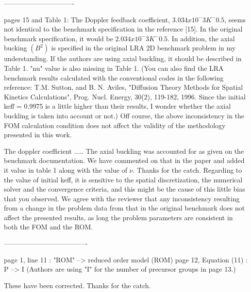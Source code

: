 \documentclass[10pt]{article}
\begin{document}
-------------------------------


\begin{response}
{ pages 15 and Table 1:
	The Doppler feedback coefficient, $3.034x10^-3 K^-0.5$, seems not identical to the benchmark specification in the reference [15]. In the original benchmark specification, it would be $2.034x10^-3 K^-0.5$.
	In addition, the axial bucking $(B^2)$ is specified in the original LRA 2D benchmark problem in my understanding. If the authors are using axial buckling, it should be described in Table 1. "nu" value is also missing in Table 1.
	(You can also find the LRA benchmark results calculated with the conventional codes in the following reference:
	T.M. Sutton, and B. N. Aviles, "Diffusion Theory Methods for Spatial Kinetics Calculations", Prog. Nucl. Energy, 30(2), 119-182, 1996.
	Since the initial keff = 0.9975 is a little higher than their results, I wonder whether the axial buckling is taken into account or not.)
	Off course, the above inconsistency in the FOM calculation condition does not affect the validity of the methodology presented in this work.}


The doppler coefficient .....
The axial buckling was accounted for as given on the benchmark documentation. We have commented on that in the paper and added it value in table 1 along with the value of $\nu$. Thanks for the catch.
Regarding to the value of initial keff, it is sensitive to the spatial discretization, the numerical solver and the convergence criteria, and this might be the cause of this little bias that you observed.
We agree with the reviewer that any inconsistency resulting from a change in the problem data from that in the original benchmark does not affect the presented results, as long the problem parameters are consistent in both the FOM and the ROM. 


-------------------------------------
\end{response}

\begin{response}
{
 page 1, line 11 : "ROM" --> reduced order model (ROM)
 page 12, Equation (11) : P --> I (Authors are using "I" for the number of precursor groups in page 13.)}

\end{response}
These have been corrected. Thanks for the catch.
\end{document}

